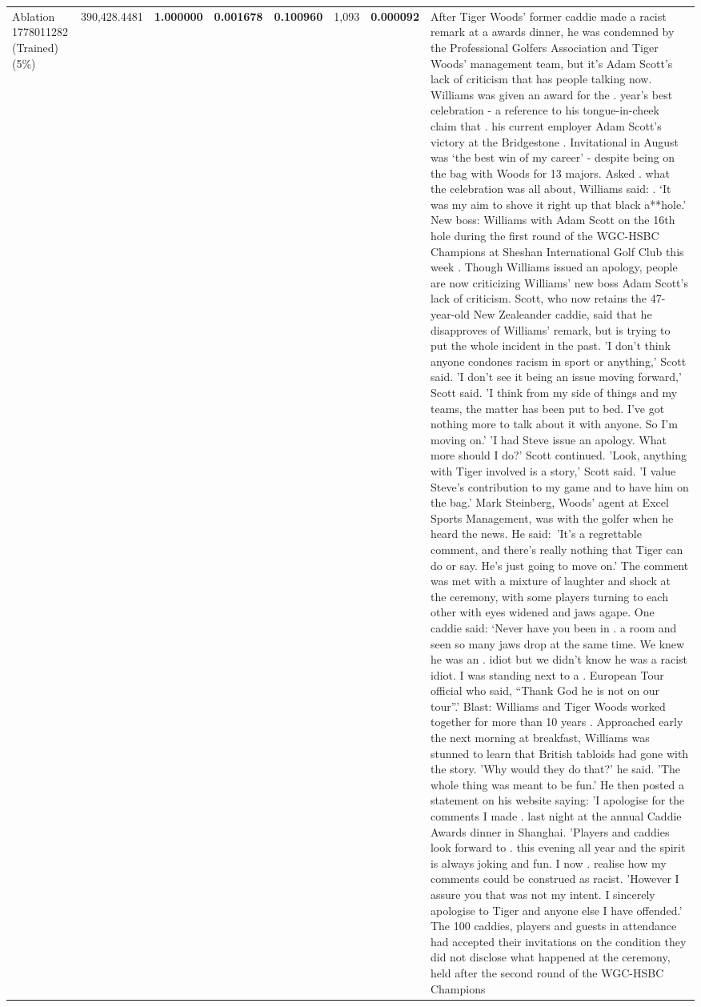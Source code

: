 \begin{table}[H]
\begin{tabular}{llrlllll}
Ablation 1778011282 (Trained) (5\%) & \color{red} 390,428.4481 & \bfseries \color{red} 1.000000 & \bfseries \color{red} 0.001678 & \bfseries \color{red} 0.100960 & \color{red} 1,093 & \bfseries \color{red} 0.000092 & After Tiger Woods' former caddie made a racist remark at a awards dinner, he was condemned by the Professional Golfers Association and Tiger Woods' management team, but it's Adam Scott's lack of criticism that has people talking now. Williams was given an award for the . year’s best celebration - a reference to his tongue-in-cheek claim that . his current employer Adam Scott’s victory at the Bridgestone . Invitational in August was ‘the best win of my career’ - despite being on the bag with Woods for 13 majors. Asked . what the celebration was all about, Williams said: . ‘It was my aim to shove it right up that black a**hole.’ New boss: Williams with Adam Scott  on the 16th hole during the first round of the WGC-HSBC Champions at Sheshan International Golf Club this week . Though Williams issued an apology, people are now criticizing Williams' new boss Adam Scott's lack of criticism. Scott, who now retains the 47-year-old New Zealeander caddie, said that he disapproves of Williams' remark, but is trying to put the whole incident in the past. 'I don't think anyone condones racism in sport or anything,' Scott said. 'I don't see it being an issue moving forward,' Scott said. 'I think from my side of things and my teams, the matter has been put to bed. I've got nothing more to talk about it with anyone. So I'm moving on.' 'I had Steve issue an apology. What more should I do?' Scott continued. 'Look, anything with Tiger involved is a story,' Scott said. 'I value Steve's contribution to my game and to have him on the bag.' Mark Steinberg, Woods' agent at Excel Sports Management, was with the golfer when he heard the news. He said: 'It's a regrettable comment, and there's really nothing that Tiger can do or say. He's just going to move on.' The comment was met with a mixture of laughter and shock at the ceremony, with some players turning to each other with eyes widened and jaws agape. One caddie said: ‘Never have you been in . a room and seen so many jaws drop at the same time. We knew he was an . idiot but we didn’t know he was a racist idiot. I was standing next to a . European Tour official who said, “Thank God he is not on our tour”.’ Blast: Williams and Tiger Woods worked together for more than 10 years . Approached early the next morning at breakfast, Williams was stunned to learn that British tabloids had gone with the story. 'Why would they do that?' he said. 'The whole thing was meant to be fun.' He then posted a statement on his website saying: 'I apologise for the comments I made . last night at the annual Caddie Awards dinner in Shanghai. 'Players and caddies look forward to . this evening all year and the spirit is always joking and fun. I now . realise how my comments could be construed as racist. 'However I assure you that was not my intent. I sincerely apologise to Tiger and anyone else I have offended.' The 100 caddies, players and guests in attendance had accepted their invitations on the condition they did not disclose what happened at the ceremony, held after the second round of the WGC-HSBC Champions 
\end{tabular}
\end{table}
